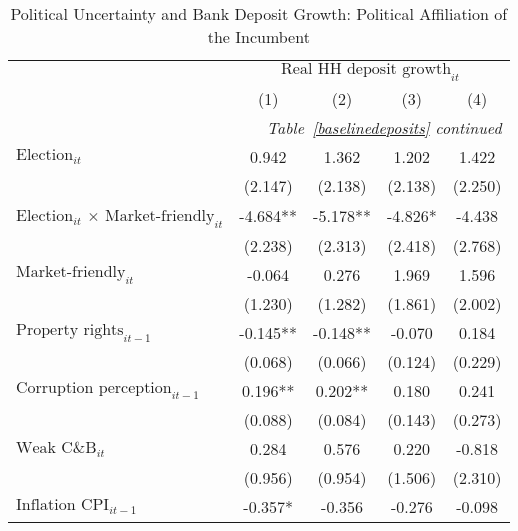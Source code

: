 \begin{longtable}{m{8cm}*{4}{c}}                                         \caption{Political Uncertainty and Bank Deposit Growth: Political Affiliation of the Incumbent \label{rldeposits}}\\                                         \toprule                                         &\multicolumn{4}{c}{$\text{Real HH deposit growth}_{it}$} \\ \cmidrule(lr){2-5}
                    &         (1)   &         (2)   &         (3)   &         (4)   \\
\midrule\endfirsthead                                         \multicolumn{5}{r}{\textit{Table~\ref{baselinedeposits} continued}} \\                                         \toprule\endhead\midrule\endfoot\endlastfoot
$\text{Election}_{it}$&       0.942   &       1.362   &       1.202   &       1.422   \\
                    &     (2.147)   &     (2.138)   &     (2.138)   &     (2.250)   \\
$\text{Election}_{it}$ $\times$ $\text{Market-friendly}_{it}$&      -4.684** &      -5.178** &      -4.826*  &      -4.438   \\
                    &     (2.238)   &     (2.313)   &     (2.418)   &     (2.768)   \\
$\text{Market-friendly}_{it}$&      -0.064   &       0.276   &       1.969   &       1.596   \\
                    &     (1.230)   &     (1.282)   &     (1.861)   &     (2.002)   \\
$\text{Property rights}_{it-1}$&      -0.145** &      -0.148** &      -0.070   &       0.184   \\
                    &     (0.068)   &     (0.066)   &     (0.124)   &     (0.229)   \\
$\text{Corruption perception}_{it-1}$&       0.196** &       0.202** &       0.180   &       0.241   \\
                    &     (0.088)   &     (0.084)   &     (0.143)   &     (0.273)   \\
$\text{Weak C\&B}_{it}$&       0.284   &       0.576   &       0.220   &      -0.818   \\
                    &     (0.956)   &     (0.954)   &     (1.506)   &     (2.310)   \\
$\text{Inflation CPI}_{it-1}$&      -0.357*  &      -0.356   &      -0.276   &      -0.098   \\

\end{longtable}
